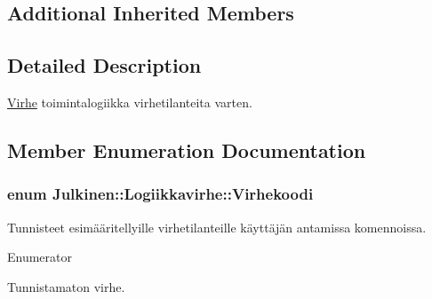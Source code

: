 \subsection*{Additional Inherited Members}


\subsection{Detailed Description}
\hyperlink{class_julkinen_1_1_virhe}{Virhe} toimintalogiikka virhetilanteita varten. 

\subsection{Member Enumeration Documentation}
\hypertarget{class_julkinen_1_1_logiikkavirhe_afbf716c9c72439df3d8638576942d14d}{}
\subsubsection[{Virhekoodi}]{\setlength{\rightskip}{0pt plus 5cm}enum {\bf Julkinen\+::\+Logiikkavirhe\+::\+Virhekoodi}}\label{class_julkinen_1_1_logiikkavirhe_afbf716c9c72439df3d8638576942d14d}


Tunnisteet esimääritellyille virhetilanteille käyttäjän antamissa komennoissa. 

\begin{Desc}
\item[Enumerator]\par
\begin{description}
\item[{\em 
\hypertarget{class_julkinen_1_1_logiikkavirhe_afbf716c9c72439df3d8638576942d14da327478ab895f92a6e547db21b050ab8f}{}V\+I\+R\+H\+E\+\_\+\+T\+U\+N\+N\+I\+S\+T\+A\+M\+A\+T\+O\+N\label{class_julkinen_1_1_logiikkavirhe_afbf716c9c72439df3d8638576942d14da327478ab895f92a6e547db21b050ab8f}
}]Tunnistamaton virhe. \end{description}
\end{Desc}


